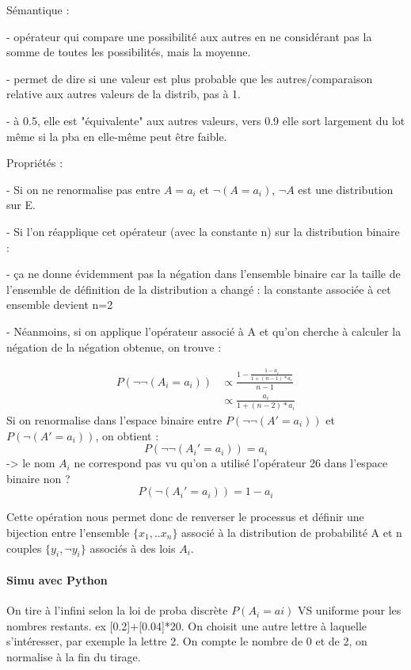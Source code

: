 \documentclass{article}
\begin{document}
  Sémantique : 
  
    - opérateur qui compare une possibilité aux autres en ne considérant pas la somme de toutes les possibilités, mais la moyenne.
    
  - permet de dire si une valeur est plus probable que les autres/comparaison relative aux autres valeurs de la distrib, pas à 1.
  
  - à 0.5, elle est "équivalente" aux autres valeurs, vers 0.9 elle sort largement du lot même si la pba en elle-même peut être faible.
  
  Propriétés :
  
  - Si on ne renormalise pas entre $A=a_i$ et $\neg(A=a_i)$, $\neg A$ est une distribution sur E.
  
  - Si l'on réapplique cet opérateur (avec la constante n) sur la distribution binaire :
  
    - ça ne donne évidemment pas la négation dans l'ensemble binaire car la taille de l'ensemble de définition de la distribution a changé :
      la constante associée à cet ensemble devient n=2
      
    - Néanmoins, si on applique l'opérateur associé à A et qu'on cherche à calculer la négation de la négation obtenue, on trouve : 

  
 \begin{align*}
 P(\neg \neg(A_i=a_i)) &\propto \frac{1-\frac{1-a_i}{1+(n-1)*a_i}}{n-1}\\
    &\propto \frac{a_i}{1+(n-2)*a_i}
 \end{align*}
  Si on renormalise dans l'espace binaire entre $P(\neg \neg(A'=a_i))$ et $P(\neg (A'=a_i))$, on obtient :
  $$P(\neg \neg(A_i'=a_i)) = a_i$$ -> le nom $A_i$ ne correspond pas vu qu'on a utilisé l'opérateur 26 dans l'espace binaire non ?
  $$P(\neg(A_i'=a_i)) = 1-a_i$$

  Cette opération nous permet donc de renverser le processus et définir une bijection entre l'ensemble $\{x_1,..x_n\}$ associé à la distribution de probabilité A et n couples $\{y_i,\neg y_i\}$ associés à des lois $A_i$.

 \paragraph{Simu avec Python }
  On tire à l'infini selon la loi de proba discrète $P(A_i=ai)$ VS uniforme pour les nombres restants. ex [0.2]+[0.04]*20. On choisit une autre lettre à laquelle s'intéresser, par exemple la lettre 2. On compte le nombre de 0 et de 2, on normalise à la fin du tirage. 
  
\end{document}
